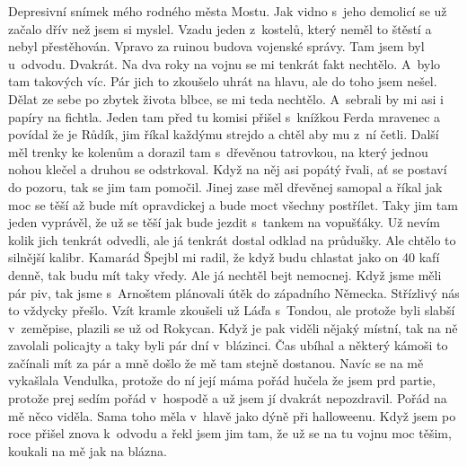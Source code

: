 
Depresivní snímek mého rodného města Mostu. Jak vidno s~jeho demolicí
se už začalo dřív než jsem si myslel. Vzadu jeden z~kostelů, který
neměl to štěstí a nebyl přestěhován. Vpravo za ruinou budova vojenské
správy. Tam jsem byl u~odvodu. Dvakrát. Na dva roky na vojnu se mi
tenkrát fakt nechtělo. A~bylo tam takových víc. Pár jich to zkoušelo
uhrát na hlavu, ale do toho jsem nešel. Dělat ze sebe po zbytek života
blbce, se mi teda nechtělo. A~sebrali by mi asi i papíry na fichtla.
Jeden tam před tu komisi přišel s~knížkou Ferda mravenec a povídal že
je Růdík, jim říkal každýmu strejdo a chtěl aby mu z~ní četli. Další
měl trenky ke kolenům a dorazil tam s~dřevěnou tatrovkou, na který
jednou nohou klečel a druhou se odstrkoval. Když na něj asi popátý
řvali, ať se postaví do pozoru, tak se jim tam pomočil. Jinej zase
měl dřevěnej samopal a říkal jak moc se těší až bude mít opravdickej a
bude moct všechny postřílet. Taky jim tam jeden vyprávěl, že už se
těší jak bude jezdit s~tankem na vopušťáky. Už nevím kolik jich
tenkrát odvedli, ale já tenkrát dostal odklad na průdušky. Ale chtělo
to silnější kalibr. Kamarád Špejbl mi radil, že když budu chlastat
jako on 40 kafí denně, tak budu mít taky vředy. Ale já nechtěl bejt
nemocnej. Když jsme měli pár piv, tak jsme s~Arnoštem plánovali útěk
do západního Německa. Střízlivý nás to vždycky přešlo. Vzít kramle
zkoušeli už Láďa s~Tondou, ale protože byli slabší v~zeměpise,
plazili se už od Rokycan. Když je pak viděli nějaký místní, tak na
ně zavolali policajty a taky byli pár dní v~blázinci. Čas ubíhal a
některý kámoši to začínali mít za pár a mně došlo že mě tam stejně
dostanou. Navíc se na mě vykašlala Vendulka, protože do ní její
máma pořád hučela že jsem prd partie, protože prej sedím pořád
v~hospodě a už jsem jí dvakrát nepozdravil. Pořád na mě něco viděla.
Sama toho měla v~hlavě jako dýně při halloweenu. Když jsem po roce
přišel znova k~odvodu a řekl jsem jim tam, že už se na tu vojnu
moc těšim, koukali na mě jak na blázna.

